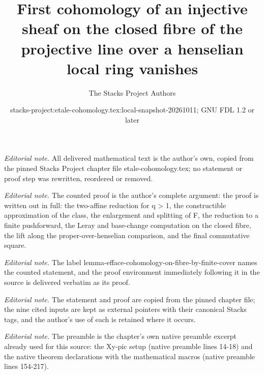 \documentclass[10pt,a4paper]{amsart}
\title{First cohomology of an injective sheaf on the closed fibre of the projective line over a henselian local ring vanishes}
\author{The Stacks Project Authors}
\date{stacks-project:etale-cohomology.tex:local-snapshot-20261011; GNU FDL 1.2 or later}
\theoremstyle{plain}
\theoremstyle{definition}
\theoremstyle{remark}
\numberwithin{equation}{subsection}
\begin{document}
\maketitle
\noindent\textit{Editorial note.} All delivered mathematical text is the author's own, copied from the pinned Stacks Project chapter file etale-cohomology.tex; no statement or proof step was rewritten, reordered or removed.\par\medskip
\noindent\textit{Editorial note.} The counted proof is the author's complete argument: the proof is written out in full: the two-affine reduction for q > 1, the constructible approximation of the class, the enlargement and splitting of F, the reduction to a finite pushforward, the Leray and base-change computation on the closed fibre, the lift along the proper-over-henselian comparison, and the final commutative square.\par\medskip
\noindent\textit{Editorial note.} The label lemma-efface-cohomology-on-fibre-by-finite-cover names the counted statement, and the proof environment immediately following it in the source is delivered verbatim as its proof.\par\medskip
\noindent\textit{Editorial note.} The statement and proof are copied from the pinned chapter file; the nine cited inputs are kept as external pointers with their canonical Stacks tags, and the author's use of each is retained where it occurs.\par\medskip
\noindent\textit{Editorial note.} The preamble is the chapter's own native preamble excerpt already used for this source: the Xy-pic setup (native preamble lines 14-18) and the native theorem declarations with the mathematical macros (native preamble lines 154-217).\par\medskip
\end{document}
